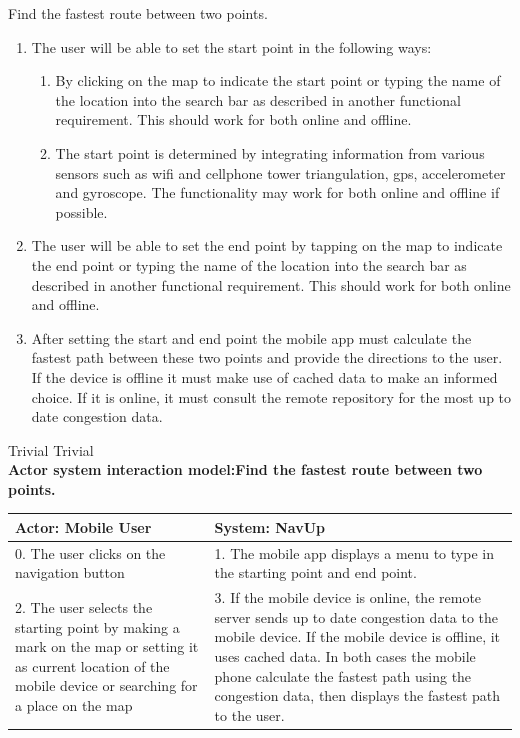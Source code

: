 \FuncReq
{Find the fastest route between two points.}%
{
  \begin{enumerate}
    \item The user will be able to set the start point in the following ways:
      \begin{enumerate}
        \item By clicking on the map to indicate the start point or typing the name of the location into the search bar as described in another functional requirement. This should work for both online and offline.
        \item The start point is determined by integrating information from various sensors such as wifi and cellphone tower triangulation, gps, accelerometer and gyroscope. The functionality may work for both online and offline if possible.
      \end{enumerate}

    \item The user will be able to set the end point by tapping on the map to indicate the end point or typing the name of the location into the search bar as described in another functional requirement. This should work for both online and offline.
    \item After setting the start and end point the mobile app must calculate the fastest path between these two points and provide the directions to the user. If the device is offline it must make use of cached data to make an informed choice. If it is online, it must consult the remote repository for the most up to date congestion data.
  \end{enumerate}
  \mbox{}%
}
{Trivial}
{Trivial}
    \\
    \textbf{Actor system interaction model:Find the fastest route between two points. }\\
    \begin{tabular}{ | p{6cm} | p{6cm} |}
    \hline
    Actor: Mobile User & System: NavUp \\ \hline
    0. The user clicks on the navigation button & 1. The mobile app displays a menu to type in the starting point and end point.\\ \hline
    2. The user selects the starting point by making a mark on the map or setting it as current location of the mobile device or searching for a place on the map & 3. If the mobile device is online, the remote server sends up to date congestion data to the mobile device. If the mobile device is offline, it uses cached data. In both cases the mobile phone calculate the fastest path using the congestion data, then displays the fastest path to the user.\\ \hline
    \end{tabular}
\\
\bigskip

